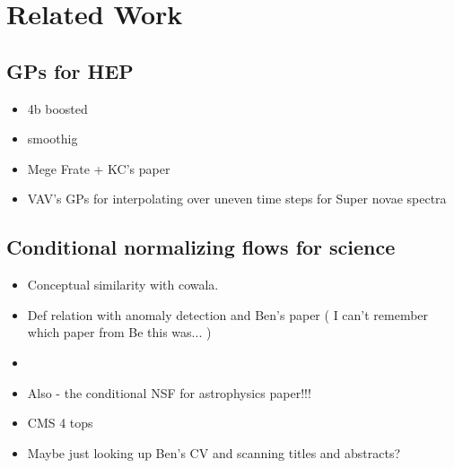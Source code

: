\section{Related Work}
\label{sec:relatedWork}

\subsection{GPs for HEP}

\begin{itemize}
    \item  4b boosted
    \item smoothig
    \item Mege Frate + KC's paper
    \item VAV's GPs for interpolating over uneven time steps for Super novae spectra
\end{itemize}


\subsection{Conditional normalizing flows for science}

\begin{itemize}
    \item Conceptual similarity with cowala.
    \item Def relation with anomaly detection and Ben's paper ( I can't remember which paper from Be this was... )
    \item 
    \item Also - the conditional NSF for astrophysics paper!!!
    \item CMS 4 tops
    \item Maybe just looking up Ben's CV and scanning titles and abstracts?
\end{itemize}

